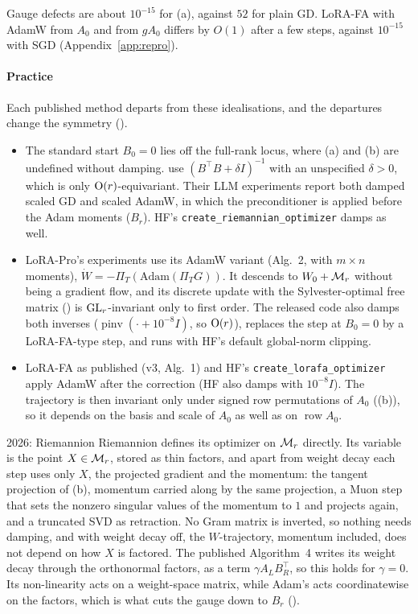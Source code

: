 \noindent{}\enspace Gauge defects are about $10^{-15}$ for (a), against $52$ for plain GD. LoRA-FA with AdamW from $A_0$ and from $gA_0$ differs by $O(1)$ after a few steps, against $10^{-15}$ with SGD (Appendix~\ref{app:repro}).

\paragraph{Practice} Each published method departs from these idealisations, and the departures change the symmetry ().
\begin{itemize}
\item The standard start $B_0=0$ lies off the full-rank locus, where (a) and (b) are undefined without damping. \citet{zhang2024riemannian} use $(B^\top B+\delta I)^{-1}$ with an unspecified $\delta>0$, which is only $\mathrm{O}(r)$-equivariant. Their LLM experiments report both damped scaled GD and scaled AdamW, in which the preconditioner is applied before the Adam moments ($B_r$). HF's \texttt{create\_riemannian\_optimizer} damps as well.
\item LoRA-Pro's experiments use its AdamW variant (Alg.~2, with $m\times n$ moments), $\dot W=-\Pi_T(\mathrm{Adam}(\Pi_TG))$. It descends to $W_0+\mathcal{M}_r$ without being a gradient flow, and its discrete update with the Sylvester-optimal free matrix () is $\mathrm{GL}_r$-invariant only to first order. The released code also damps both inverses ($\operatorname{pinv}(\cdot+10^{-8}I)$, so $\mathrm{O}(r)$), replaces the step at $B_0=0$ by a LoRA-FA-type step, and runs with HF's default global-norm clipping.
\item LoRA-FA as published (v3, Alg.~1) and HF's \texttt{create\_lorafa\_optimizer} apply AdamW after the correction (HF also damps with $10^{-8}I$). The trajectory is then invariant only under signed row permutations of $A_0$ ((b)), so it depends on the basis and scale of $A_0$ as well as on $\operatorname{row}A_0$.
\end{itemize}

\begin{remark*}{2026: Riemannion}
Riemannion \citep{bogachev2025lora} defines its optimizer on $\mathcal{M}_r$ directly. Its variable is the point $X\in\mathcal{M}_r$, stored as thin factors, and apart from weight decay each step uses only $X$, the projected gradient and the momentum: the tangent projection of (b), momentum carried along by the same projection, a Muon step \citep{xjordan2024muon} that sets the nonzero singular values of the momentum to $1$ and projects again, and a truncated SVD as retraction. No Gram matrix is inverted, so nothing needs damping, and with weight decay off, the $W$-trajectory, momentum included, does not depend on how $X$ is factored. The published Algorithm~4 writes its weight decay through the orthonormal factors, as a term $\gamma A_LB_R^\top$, so this holds for $\gamma=0$. Its non-linearity acts on a weight-space matrix, while Adam's acts coordinatewise on the factors, which is what cuts the gauge down to $B_r$ ().
\end{remark*}

